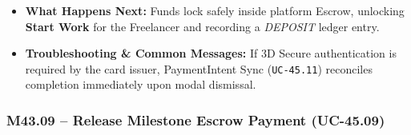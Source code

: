 \begin{itemize}[leftmargin=1.5em,itemsep=2pt]
  \item \textbf{What Happens Next:} Funds lock safely inside platform Escrow, unlocking \textbf{Start Work} for the Freelancer and recording a \textit{DEPOSIT} ledger entry.
  \item \textbf{Troubleshooting \& Common Messages:} If 3D Secure authentication is required by the card issuer, PaymentIntent Sync (\texttt{UC-45.11}) reconciles completion immediately upon modal dismissal.
\end{itemize}

\newpage
\subsubsection[M43.09 -- Release Milestone Escrow (UC-45.09)]{M43.09 -- Release Milestone Escrow Payment (UC-45.09)}


